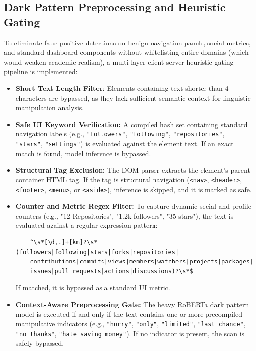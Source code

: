 \documentclass[12pt,a4paper]{report}
\begin{document}
\subsection{Dark Pattern Preprocessing and Heuristic Gating}
To eliminate false-positive detections on benign navigation panels, social metrics, and standard dashboard components without whitelisting entire domains (which would weaken academic realism), a multi-layer client-server heuristic gating pipeline is implemented:
\begin{itemize}
    \item \textbf{Short Text Length Filter:} Elements containing text shorter than 4 characters are bypassed, as they lack sufficient semantic context for linguistic manipulation analysis.
    \item \textbf{Safe UI Keyword Verification:} A compiled hash set containing standard navigation labels (e.g., \texttt{"followers"}, \texttt{"following"}, \texttt{"repositories"}, \texttt{"stars"}, \texttt{"settings"}) is evaluated against the element text. If an exact match is found, model inference is bypassed.
    \item \textbf{Structural Tag Exclusion:} The DOM parser extracts the element's parent container HTML tag. If the tag is structural navigation (\texttt{<nav>}, \texttt{<header>}, \texttt{<footer>}, \texttt{<menu>}, or \texttt{<aside>}), inference is skipped, and it is marked as safe.
    \item \textbf{Counter and Metric Regex Filter:} To capture dynamic social and profile counters (e.g., "12 Repositories", "1.2k followers", "35 stars"), the text is evaluated against a regular expression pattern:
    \begin{verbatim}
    ^\s*[\d,.]+[km]?\s*(followers|following|stars|forks|repositories|
    contributions|commits|views|members|watchers|projects|packages|
    issues|pull requests|actions|discussions)?\s*$
    \end{verbatim}
    If matched, it is bypassed as a standard UI metric.
    \item \textbf{Context-Aware Preprocessing Gate:} The heavy RoBERTa dark pattern model is executed if and only if the text contains one or more precompiled manipulative indicators (e.g., \texttt{"hurry"}, \texttt{"only"}, \texttt{"limited"}, \texttt{"last chance"}, \texttt{"no thanks"}, \texttt{"hate saving money"}). If no indicator is present, the scan is safely bypassed.
\end{itemize}
\end{document}
